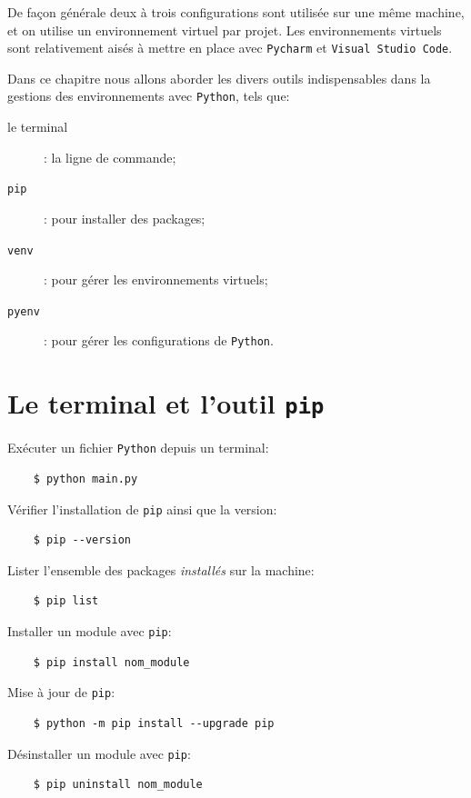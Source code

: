 \documentclass[a4paper,11pt]{book}
\begin{document}
De façon générale deux à trois configurations sont utilisée sur une même machine, et  on utilise  un environnement virtuel par projet. Les environnements virtuels sont relativement aisés à mettre en place  avec \texttt{Pycharm} et \texttt{Visual Studio Code}.
\medskip

Dans ce chapitre nous allons aborder les divers outils indispensables dans la gestions des environnements avec \texttt{Python}, tels que:
\begin{description}
	\item[le terminal]: la ligne de commande;
	\item[\texttt{pip}]: pour installer des packages;
	\item[\texttt{venv}]: pour gérer les environnements virtuels;
	\item[\texttt{pyenv}]: pour gérer les configurations de \texttt{Python}.
\end{description}
\medskip

\section{Le terminal et l'outil \texttt{pip}}
Exécuter un fichier \texttt{Python} depuis un terminal:
\begin{verbatim}
    $ python main.py
\end{verbatim} 
\medskip

Vérifier l'installation de \texttt{pip} ainsi que la version:
\begin{verbatim}
    $ pip --version
\end{verbatim}
\medskip

Lister l'ensemble des packages \textit{installés} sur la machine:
\begin{verbatim}
    $ pip list
\end{verbatim}
\medskip

Installer un module avec \texttt{pip}:
\begin{verbatim}
    $ pip install nom_module
\end{verbatim}
\medskip

Mise à jour de \texttt{pip}:
\begin{verbatim}
    $ python -m pip install --upgrade pip
\end{verbatim}
\medskip

Désinstaller un module avec \texttt{pip}:
\begin{verbatim}
    $ pip uninstall nom_module
\end{verbatim}
\medskip
\end{document}
